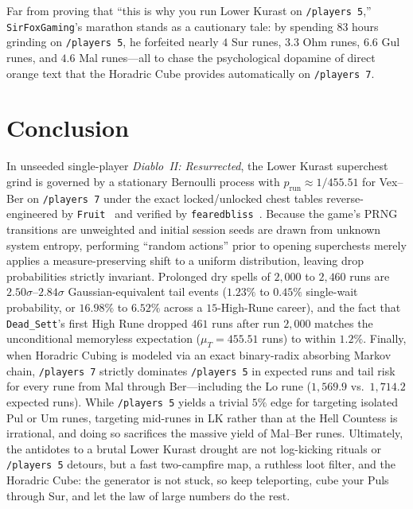 \documentclass[11pt,reqno]{amsart}
\theoremstyle{definition}
\begin{document}
Far from proving that ``this is why you run Lower Kurast on \texttt{/players~5},'' \texttt{SirFoxGaming}'s marathon stands as a cautionary tale: by spending $83$ hours grinding on \texttt{/players~5}, he forfeited nearly $4$ Sur runes, $3.3$ Ohm runes, $6.6$ Gul runes, and $4.6$ Mal runes—all to chase the psychological dopamine of direct orange text that the Horadric Cube provides automatically on \texttt{/players~7}.

\FloatBarrier
\section{Conclusion}

In unseeded single-player \emph{Diablo~II: Resurrected}, the Lower Kurast superchest grind is governed by a stationary Bernoulli process with $p_{\text{run}} \approx 1/455.51$ for Vex--Ber on \texttt{/players~7} under the exact locked/unlocked chest tables reverse-engineered by \texttt{Fruit}~\cite{fruit_d2pg} and verified by \texttt{fearedbliss}~\cite{fearedbliss_lk}. Because the game's PRNG transitions are unweighted and initial session seeds are drawn from unknown system entropy, performing ``random actions'' prior to opening superchests merely applies a measure-preserving shift to a uniform distribution, leaving drop probabilities strictly invariant. Prolonged dry spells of $2{,}000$ to $2{,}460$ runs are $2.50\sigma$--$2.84\sigma$ Gaussian-equivalent tail events ($1.23\%$ to $0.45\%$ single-wait probability, or $16.98\%$ to $6.52\%$ across a $15$-High-Rune career), and the fact that \texttt{Dead\_Sett}'s first High Rune dropped $461$ runs after run $2{,}000$ matches the unconditional memoryless expectation ($\mu_T = 455.51$ runs) to within $1.2\%$. Finally, when Horadric Cubing is modeled via an exact binary-radix absorbing Markov chain, \texttt{/players~7} strictly dominates \texttt{/players~5} in expected runs and tail risk for every rune from Mal through Ber—including the Lo rune ($1{,}569.9$ vs.\ $1{,}714.2$ expected runs). While \texttt{/players~5} yields a trivial $5\%$ edge for targeting isolated Pul or Um runes, targeting mid-runes in LK rather than at the Hell Countess is irrational, and doing so sacrifices the massive yield of Mal--Ber runes. Ultimately, the antidotes to a brutal Lower Kurast drought are not log-kicking rituals or \texttt{/players~5} detours, but a fast two-campfire map, a ruthless loot filter, and the Horadric Cube: the generator is not stuck, so keep teleporting, cube your Puls through Sur, and let the law of large numbers do the rest.
\end{document}
